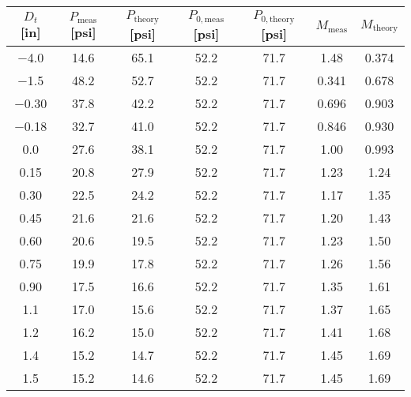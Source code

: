 \begin{tabular}{ccccccc}
\toprule
$D_t$ [\unit{in}] & $P_\text{meas}$ [\unit{psi}] & $P_\text{theory}$ [\unit{psi}] & $P_{0,\text{meas}}$ [\unit{psi}] & $P_{0,\text{theory}}$ [\unit{psi}] & $M_\text{meas}$ & $M_\text{theory}$ \\
\midrule
\num{-4.0} & \num{14.6} & \num{65.1} & \num{52.2} & \num{71.7} & \num{1.48} & \num{0.374} \\ 
\num{-1.5} & \num{48.2} & \num{52.7} & \num{52.2} & \num{71.7} & \num{0.341} & \num{0.678} \\ 
\num{-0.30} & \num{37.8} & \num{42.2} & \num{52.2} & \num{71.7} & \num{0.696} & \num{0.903} \\ 
\num{-0.18} & \num{32.7} & \num{41.0} & \num{52.2} & \num{71.7} & \num{0.846} & \num{0.930} \\ 
\num{0.0} & \num{27.6} & \num{38.1} & \num{52.2} & \num{71.7} & \num{1.00} & \num{0.993} \\ 
\num{0.15} & \num{20.8} & \num{27.9} & \num{52.2} & \num{71.7} & \num{1.23} & \num{1.24} \\ 
\num{0.30} & \num{22.5} & \num{24.2} & \num{52.2} & \num{71.7} & \num{1.17} & \num{1.35} \\ 
\num{0.45} & \num{21.6} & \num{21.6} & \num{52.2} & \num{71.7} & \num{1.20} & \num{1.43} \\ 
\num{0.60} & \num{20.6} & \num{19.5} & \num{52.2} & \num{71.7} & \num{1.23} & \num{1.50} \\ 
\num{0.75} & \num{19.9} & \num{17.8} & \num{52.2} & \num{71.7} & \num{1.26} & \num{1.56} \\ 
\num{0.90} & \num{17.5} & \num{16.6} & \num{52.2} & \num{71.7} & \num{1.35} & \num{1.61} \\ 
\num{1.1} & \num{17.0} & \num{15.6} & \num{52.2} & \num{71.7} & \num{1.37} & \num{1.65} \\ 
\num{1.2} & \num{16.2} & \num{15.0} & \num{52.2} & \num{71.7} & \num{1.41} & \num{1.68} \\ 
\num{1.4} & \num{15.2} & \num{14.7} & \num{52.2} & \num{71.7} & \num{1.45} & \num{1.69} \\ 
\num{1.5} & \num{15.2} & \num{14.6} & \num{52.2} & \num{71.7} & \num{1.45} & \num{1.69} \\ 
\bottomrule
\end{tabular}